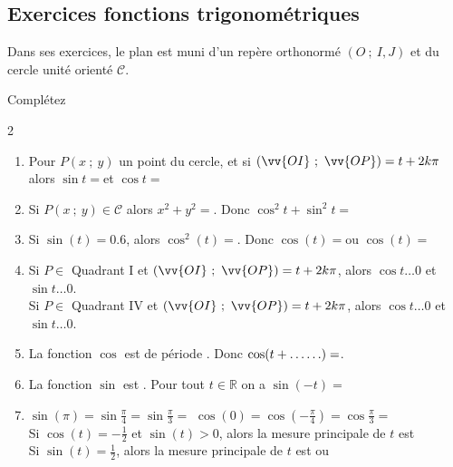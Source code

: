\documentclass[main.tex]{subfiles}
\begin{document}
%	 
\newpage 
{}  
\pagestyle{scrheadings} %
\onehalfspacing 
\subsection{Exercices fonctions trigonométriques} 
\begin{eBox}
	Dans ses exercices, le plan est muni d'un repère orthonormé $(O~;~I,J)$ et du cercle unité orienté $\mathscr{C}$.
\end{eBox}
\begin{exercise}[concepts] Complétez
\begin{spacing}{2}
\begin{enumerate}[label={\alph*)},leftmargin=*]
	\item  Pour $P(x~;~y)$ un point du cercle, et si $(\vv{OI}~;~\vv{OP})=t+2k\pi$ alors $\sin{t}=$\dotfill et $\cos{t}=$\dotfill
	\item Si $P(x~;~y)\in\mathscr{C}$ alors $x^2+y^2=$\dotfill. Donc $\cos^2 t +\sin^2 t=$\dotfill 
 \item Si $\sin(t)=0.6$, alors $\cos^2(t)=$\dotfill. Donc $\cos(t)=$\dotfill ou $\cos(t)=$\dotfill  
	\item Si $P\in$ Quadrant \RN{1} et $(\vv{OI}~;~\vv{OP})=t+2k\pi$, alors $\cos t\ldots 0$ et $\sin t \ldots 0$.
\\ Si $P\in$ Quadrant \RN{4} et $(\vv{OI}~;~\vv{OP})=t+2k\pi$, alors $\cos t\ldots 0$ et $\sin t \ldots 0$.
	\item La fonction $\cos$ est de période \dotfill. Donc $\cos(t+\ldots\ldots)=\dotfill$.
	\item La fonction $\sin$ est \dotfill. Pour tout $t\in\mathbb{R}$ on a $\sin(-t)=$\dotfill   
	 \item  $\sin(\pi)=$\dotfill$\sin\tfrac{\pi}{4}= $\dotfill $\sin\tfrac{\pi}{3}=$\dotfill 
	 $\cos(0)=$\dotfill$\cos(-\tfrac{\pi}{4})= $\dotfill $\cos\tfrac{\pi}{3}=$\dotfill  
	  \\ Si   $\cos(t)=-\tfrac{1}{2}$ et $\sin(t)>0$, alors la mesure principale de $t$ est \dotfill  
	 \\ Si $\sin(t)=\tfrac{1}{2}$, alors la mesure principale de $t$ est \dotfill ou \dotfill 
\end{enumerate}
\end{spacing} \vspace{-0.5em}
\end{exercise}  
\end{document}
